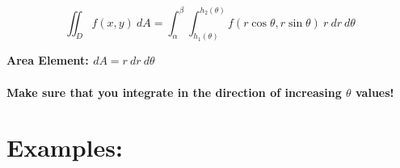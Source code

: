\[
\iint_D f(x,y)\ dA = \int_\alpha^\beta \int_{h_1(\theta)}^{h_2(\theta)} f(r\cos\theta,r\sin\theta)\ r\ dr\ d\theta
\]

\textbf{Area Element: \(dA = r\ dr\ d\theta\)}\\~\\
\textbf{Make sure that you integrate in the direction of increasing \(\theta\) values!}






\section*{Examples:}



